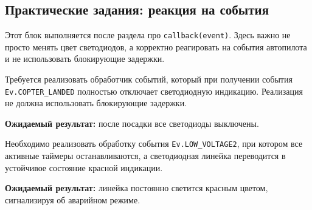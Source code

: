 \subsection{Практические задания: реакция на события}
Этот блок выполняется после раздела про \verb|callback(event)|. Здесь важно не просто менять цвет светодиодов, а корректно реагировать на события автопилота и не использовать блокирующие задержки.

\begin{taskbox}
\indent Требуется реализовать обработчик событий, который при получении события \verb|Ev.COPTER_LANDED| полностью отключает светодиодную индикацию. Реализация не должна использовать блокирующие задержки.

\noindent\textbf{Ожидаемый результат:} после посадки все светодиоды выключены.
\end{taskbox}

\begin{taskbox}
\indent Необходимо реализовать обработку события \verb|Ev.LOW_VOLTAGE2|, при котором все активные таймеры останавливаются, а светодиодная линейка переводится в устойчивое состояние красной индикации.

\noindent\textbf{Ожидаемый результат:} линейка постоянно светится красным цветом, сигнализируя об аварийном режиме.
\end{taskbox}
